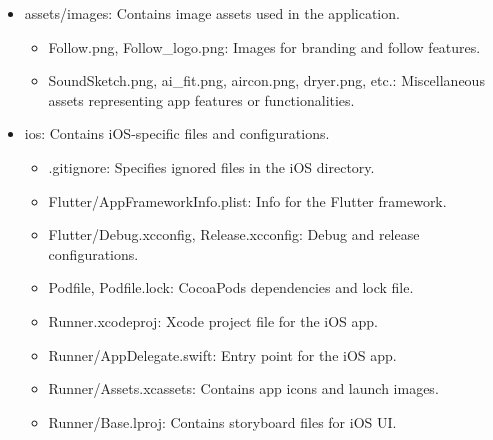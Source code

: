 \documentclass[conference]{IEEEtran}
\begin{document}
\begin{itemize}
    \item assets/images: Contains image assets used in the application.
    \begin{itemize}
        \item Follow.png, Follow\_logo.png: Images for branding and follow features.\\
        \item SoundSketch.png, ai\_fit.png, aircon.png, dryer.png, etc.: Miscellaneous assets representing app features or functionalities. \\
    \end{itemize}

    \item ios: Contains iOS-specific files and configurations.
    \begin{itemize}
        \item .gitignore: Specifies ignored files in the iOS directory. \\
        \item Flutter/AppFrameworkInfo.plist: Info for the Flutter framework. \\
        \item Flutter/Debug.xcconfig, Release.xcconfig: Debug and release configurations. \\
        \item Podfile, Podfile.lock: CocoaPods dependencies and lock file. \\
        \item Runner.xcodeproj: Xcode project file for the iOS app. \\
        \item Runner/AppDelegate.swift: Entry point for the iOS app. \\
        \item Runner/Assets.xcassets: Contains app icons and launch images. \\
        \item Runner/Base.lproj: Contains storyboard files for iOS UI. \\
    \end{itemize}


\end{itemize}
\end{document}
